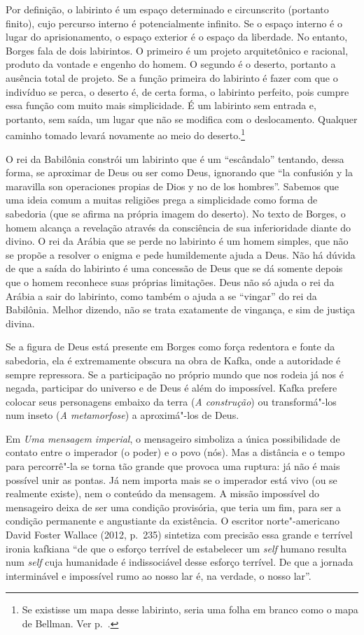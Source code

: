 Por definição, o labirinto é um espaço determinado e circunscrito
(portanto finito), cujo percurso interno é potencialmente infinito. Se o
espaço interno é o lugar do aprisionamento, o espaço exterior é o espaço
da liberdade. No entanto, Borges fala de dois labirintos. O primeiro é
um projeto arquitetônico e racional, produto da vontade e engenho do
homem. O segundo é o deserto, portanto a ausência total de projeto. Se a
função primeira do labirinto é fazer com que o indivíduo se perca, o
deserto é, de certa forma, o labirinto perfeito, pois cumpre essa função
com muito mais simplicidade. É um labirinto sem entrada e, portanto, sem
saída, um lugar que não se modifica com o deslocamento. Qualquer caminho
tomado levará novamente ao meio do deserto.\footnote{Se existisse um
  mapa desse labirinto, seria uma folha em branco como o mapa de
  Bellman. Ver p.~\pageref{bellman}.}

O rei da Babilônia constrói um labirinto que é um ``escândalo''
tentando, dessa forma, se aproximar de Deus ou ser como Deus, ignorando
que ``la confusión y la maravilla son operaciones propias de Dios y no
de los hombres''. Sabemos que uma ideia comum a muitas religiões prega a
simplicidade como forma de sabedoria (que se afirma na própria imagem do
deserto). No texto de Borges, o homem alcança a revelação através da
consciência de sua inferioridade diante do divino. O rei da Arábia que
se perde no labirinto é um homem simples, que não se propõe a resolver o
enigma e pede humildemente ajuda a Deus. Não há dúvida de que a saída do
labirinto é uma concessão de Deus que se dá somente depois que o homem
reconhece suas próprias limitações. Deus não só ajuda o rei da Arábia a
sair do labirinto, como também o ajuda a se ``vingar'' do rei da
Babilônia. Melhor dizendo, não se trata exatamente de vingança, e sim de
justiça divina.

Se a figura de Deus está presente em Borges como força redentora e fonte
da sabedoria, ela é extremamente obscura na obra de Kafka, onde a
autoridade é sempre repressora. Se a participação no próprio mundo que
nos rodeia já nos é negada, participar do universo e de Deus é além do
impossível. Kafka prefere colocar seus personagens embaixo da terra
(\emph{A construção}) ou transformá"-los num inseto (\emph{A
metamorfose}) a aproximá"-los de Deus.

Em \emph{Uma mensagem imperial}, o mensageiro simboliza a única
possibilidade de contato entre o imperador (o poder) e o povo (nós). Mas
a distância e o tempo para percorrê"-la se torna tão grande que provoca
uma ruptura: já não é mais possível unir as pontas. Já nem importa mais
se o imperador está vivo (ou se realmente existe), nem o conteúdo da
mensagem. A missão impossível do mensageiro deixa de ser uma condição
provisória, que teria um fim, para ser a condição permanente e
angustiante da existência. O escritor norte"-americano David Foster
Wallace (2012, p.~235) sintetiza com precisão essa grande e terrível
ironia kafkiana ``de que o esforço terrível de estabelecer um
\emph{self} humano resulta num \emph{self} cuja humanidade é
indissociável desse esforço terrível. De que a jornada interminável e
impossível rumo ao nosso lar é, na verdade, o nosso lar''.

